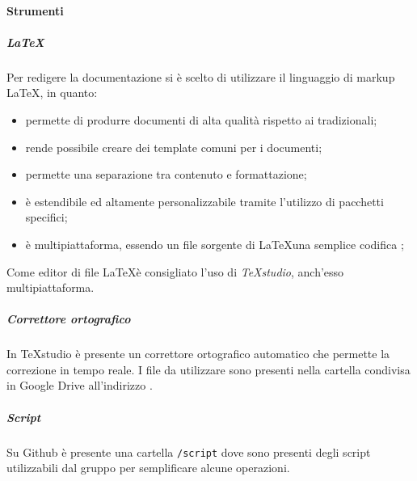 \paragraph{Strumenti}
	\subparagraph{\LaTeX}
	Per redigere la documentazione si è scelto di utilizzare il linguaggio di markup \LaTeX, in quanto: \\
	\begin{itemize} 
		\item permette di produrre documenti di alta qualità rispetto ai  tradizionali; 
		\item rende possibile creare dei template comuni per i documenti;
		\item permette una separazione tra contenuto e formattazione;
		\item è estendibile ed altamente personalizzabile tramite l'utilizzo di pacchetti specifici;
		\item è multipiattaforma, essendo un file sorgente di \LaTeX una semplice codifica ;
		\end{itemize}
		Come editor di file \LaTeX è consigliato l'uso di \textit{TeXstudio}, anch'esso multipiattaforma.	
	\subparagraph{Correttore ortografico}
	In TeXstudio è presente un correttore ortografico automatico che permette la correzione in tempo reale. I file da utilizzare sono presenti nella cartella condivisa in Google Drive all'indirizzo .
	\subparagraph{Script}
		Su Github è presente una cartella \texttt{/script} dove sono presenti degli script utilizzabili dal gruppo per semplificare alcune operazioni.